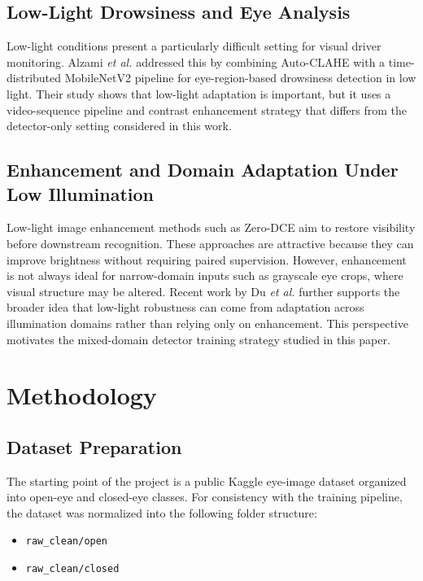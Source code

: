 \documentclass[conference]{IEEEtran}
\begin{document}
\subsection{Low-Light Drowsiness and Eye Analysis}

Low-light conditions present a particularly difficult setting for visual driver monitoring. Alzami \emph{et al.} \cite{alzami2024} addressed this by combining Auto-CLAHE with a time-distributed MobileNetV2 pipeline for eye-region-based drowsiness detection in low light. Their study shows that low-light adaptation is important, but it uses a video-sequence pipeline and contrast enhancement strategy that differs from the detector-only setting considered in this work.

\subsection{Enhancement and Domain Adaptation Under Low Illumination}

Low-light image enhancement methods such as Zero-DCE \cite{guo2020} aim to restore visibility before downstream recognition. These approaches are attractive because they can improve brightness without requiring paired supervision. However, enhancement is not always ideal for narrow-domain inputs such as grayscale eye crops, where visual structure may be altered. Recent work by Du \emph{et al.} \cite{du2024} further supports the broader idea that low-light robustness can come from adaptation across illumination domains rather than relying only on enhancement. This perspective motivates the mixed-domain detector training strategy studied in this paper.

\section{Methodology}

\subsection{Dataset Preparation}

The starting point of the project is a public Kaggle eye-image dataset organized into open-eye and closed-eye classes. For consistency with the training pipeline, the dataset was normalized into the following folder structure:

\begin{itemize}
\item \texttt{raw\_clean/open}
\item \texttt{raw\_clean/closed}
\end{itemize}
\end{document}
